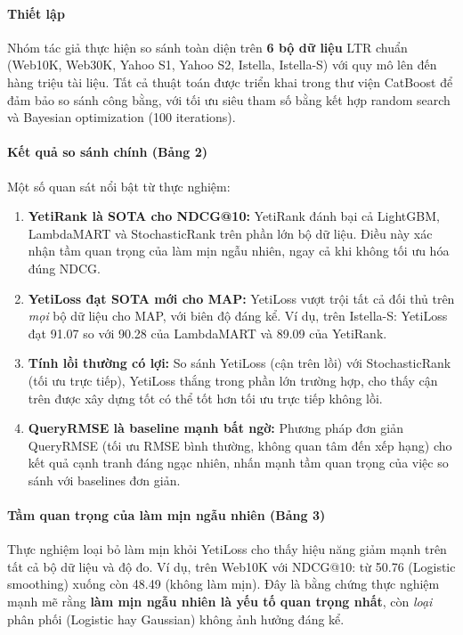 \paragraph{Thiết lập}
Nhóm tác giả thực hiện so sánh toàn diện trên \textbf{6 bộ dữ liệu} LTR chuẩn (Web10K, Web30K, Yahoo S1, Yahoo S2, Istella, Istella-S) với quy mô lên đến hàng triệu tài liệu. Tất cả thuật toán được triển khai trong thư viện CatBoost để đảm bảo so sánh công bằng, với tối ưu siêu tham số bằng kết hợp random search và Bayesian optimization (100 iterations).

\paragraph{Kết quả so sánh chính (Bảng 2)}
Một số quan sát nổi bật từ thực nghiệm:
\begin{enumerate}
  \item \textbf{YetiRank là SOTA cho NDCG@10:} YetiRank đánh bại cả LightGBM, LambdaMART và StochasticRank trên phần lớn bộ dữ liệu. Điều này xác nhận tầm quan trọng của làm mịn ngẫu nhiên, ngay cả khi không tối ưu hóa đúng NDCG.
  \item \textbf{YetiLoss đạt SOTA mới cho MAP:} YetiLoss vượt trội tất cả đối thủ trên \emph{mọi} bộ dữ liệu cho MAP, với biên độ đáng kể. Ví dụ, trên Istella-S: YetiLoss đạt 91.07 so với 90.28 của LambdaMART và 89.09 của YetiRank.
  \item \textbf{Tính lồi thường có lợi:} So sánh YetiLoss (cận trên lồi) với StochasticRank (tối ưu trực tiếp), YetiLoss thắng trong phần lớn trường hợp, cho thấy cận trên được xây dựng tốt có thể tốt hơn tối ưu trực tiếp không lồi.
  \item \textbf{QueryRMSE là baseline mạnh bất ngờ:} Phương pháp đơn giản QueryRMSE (tối ưu RMSE bình thường, không quan tâm đến xếp hạng) cho kết quả cạnh tranh đáng ngạc nhiên, nhấn mạnh tầm quan trọng của việc so sánh với baselines đơn giản.
\end{enumerate}

\paragraph{Tầm quan trọng của làm mịn ngẫu nhiên (Bảng 3)}
Thực nghiệm loại bỏ làm mịn khỏi YetiLoss cho thấy hiệu năng giảm mạnh trên tất cả bộ dữ liệu và độ đo. Ví dụ, trên Web10K với NDCG@10: từ 50.76 (Logistic smoothing) xuống còn 48.49 (không làm mịn). Đây là bằng chứng thực nghiệm mạnh mẽ rằng \textbf{làm mịn ngẫu nhiên là yếu tố quan trọng nhất}, còn \emph{loại} phân phối (Logistic hay Gaussian) không ảnh hưởng đáng kể.

